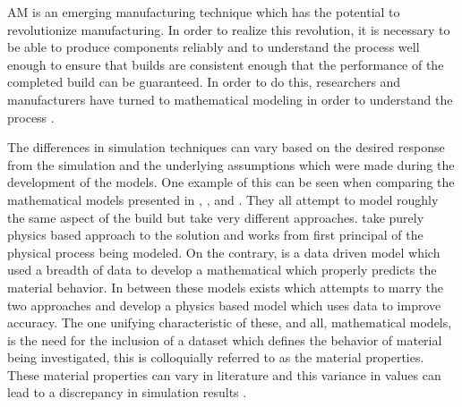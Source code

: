 \label{introAMsim}

\Acf{AM} is an emerging manufacturing technique which has the potential to revolutionize manufacturing.  In order to realize this revolution, it is necessary to be able to produce components reliably and to understand the process well enough to ensure that builds are consistent enough that the performance of the completed build can be guaranteed.  In order to do this, researchers and manufacturers have turned to mathematical modeling in order to understand the process \cite{wangClosedLoopHighFidelitySimulation2021}.  

The differences in simulation techniques can vary based on the desired response from the simulation and the underlying assumptions which were made during the development of the models.
One example of this can be seen when comparing the mathematical models presented in \cite{mogesHYBRIDMODELINGAPPROACH2020}, \cite{royDatadrivenModelingThermal2020}, and \cite{mogesHYBRIDMODELINGAPPROACH2020}.  They all attempt to model roughly the same aspect of the build but take very different approaches.
\cite{mogesHYBRIDMODELINGAPPROACH2020} take purely physics based approach to the solution and works from first principal of the physical process being modeled.
On the contrary, \cite{royDatadrivenModelingThermal2020} is a data driven model which used a breadth of data to develop a mathematical which properly predicts the material behavior. 
In between these models exists \cite{mogesHYBRIDMODELINGAPPROACH2020} which attempts to marry the two approaches and develop a physics based model which uses data to improve accuracy.
The one unifying characteristic of these, and all, mathematical models, is the need for the inclusion of a dataset which defines the behavior of material being investigated, this is colloquially referred to as the material properties.  These material properties can vary in literature and this variance in values can lead to a discrepancy in simulation results \cite{Daryabeigi2011}.

